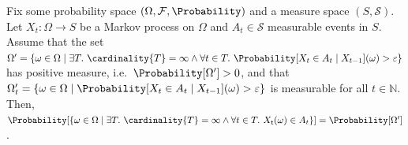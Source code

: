 \documentclass{theoretics}
\newcommand{\Naturals}{\mathbb{N}}
\newcommand{\algostep}{\mathsf{t}}
\begin{document}
\begin{lemma} \label{stm:markov_process_repeating}
	Fix some probability space $(\Omega, \mathcal{F}, \Probability)$ and a measure space $(S, \mathcal{S})$.
	Let $X_t : \Omega \to S$ be a Markov process on $\Omega$ and $A_t \in \mathcal{S}$ measurable events in $S$.
	Assume that the set $\Omega' = \{\omega \in \Omega \mid \exists T.~\cardinality{T} = \infty \land \forall t \in T.~\Probability[X_t \in A_t \mid X_{t-1}](\omega) > \varepsilon\}$ has positive measure, i.e.\ $\Probability[\Omega'] > 0$, and that $\Omega'_t = \{\omega \in \Omega \mid \Probability[X_t \in A_t \mid X_{t-1}](\omega) > \varepsilon\}$ is measurable for all $t \in \Naturals$.
	Then, $\Probability[\{\omega \in \Omega \mid \exists T.~\cardinality{T} = \infty \land \forall t \in T.~X_\algostep(\omega) \in A_t\}] = \Probability[\Omega']$.
\end{lemma}
\end{document}
